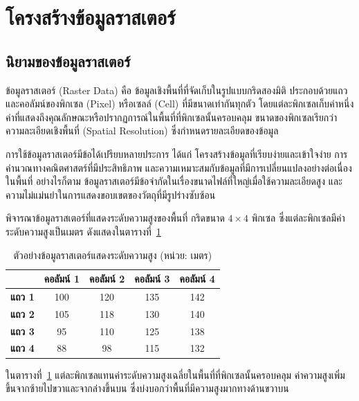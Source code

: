 \section{โครงสร้างข้อมูลราสเตอร์}

\subsection{นิยามของข้อมูลราสเตอร์}
ข้อมูลราสเตอร์ (Raster Data) คือ ข้อมูลเชิงพื้นที่ที่จัดเก็บในรูปแบบกริดสองมิติ ประกอบด้วยแถวและคอลัมน์ของพิกเซล (Pixel) หรือเซลล์ (Cell) ที่มีขนาดเท่ากันทุกตัว โดยแต่ละพิกเซลเก็บค่าหนึ่งค่าที่แสดงถึงคุณลักษณะหรือปรากฏการณ์ในพื้นที่ที่พิกเซลนั้นครอบคลุม ขนาดของพิกเซลเรียกว่า ความละเอียดเชิงพื้นที่ (Spatial Resolution) ซึ่งกำหนดรายละเอียดของข้อมูล

การใช้ข้อมูลราสเตอร์มีข้อได้เปรียบหลายประการ ได้แก่ โครงสร้างข้อมูลที่เรียบง่ายและเข้าใจง่าย การคำนวณทางคณิตศาสตร์ที่มีประสิทธิภาพ และความเหมาะสมกับข้อมูลที่มีการเปลี่ยนแปลงอย่างต่อเนื่องในพื้นที่ อย่างไรก็ตาม ข้อมูลราสเตอร์มีข้อจำกัดในเรื่องขนาดไฟล์ที่ใหญ่เมื่อใช้ความละเอียดสูง และความไม่แม่นยำในการแสดงขอบเขตของวัตถุที่มีรูปร่างซับซ้อน

\begin{ex}
พิจารณาข้อมูลราสเตอร์ที่แสดงระดับความสูงของพื้นที่ กริดขนาด $4 \times 4$ พิกเซล ซึ่งแต่ละพิกเซลมีค่าระดับความสูงเป็นเมตร ดังแสดงในตารางที่~\ref{tab:raster-example}

\begin{table}[ht]
\centering
\caption{ตัวอย่างข้อมูลราสเตอร์แสดงระดับความสูง (หน่วย: เมตร)}
\label{tab:raster-example}
\begin{tabular}{|c|c|c|c|c|}
\hline
 & \textbf{คอลัมน์ 1} & \textbf{คอลัมน์ 2} & \textbf{คอลัมน์ 3} & \textbf{คอลัมน์ 4} \\ \hline
\textbf{แถว 1} & 100 & 120 & 135 & 142 \\ \hline
\textbf{แถว 2} & 105 & 118 & 130 & 140 \\ \hline
\textbf{แถว 3} & 95  & 110 & 125 & 138 \\ \hline
\textbf{แถว 4} & 88  & 98  & 115 & 132 \\ \hline
\end{tabular}
\end{table}

ในตารางที่~\ref{tab:raster-example} แต่ละพิกเซลแทนค่าระดับความสูงเฉลี่ยในพื้นที่ที่พิกเซลนั้นครอบคลุม ค่าความสูงเพิ่มขึ้นจากซ้ายไปขวาและจากล่างขึ้นบน ซึ่งบ่งบอกว่าพื้นที่มีความสูงมากทางด้านขวาบน
\end{ex}

